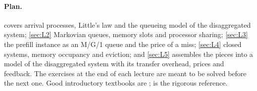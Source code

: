 \paragraph{Plan.}  covers arrival processes, Little's law and the
queueing model of the disaggregated system; \cref{sec:L2} Markovian queues,
memory slots and processor sharing; \cref{sec:L3} the prefill instance as an M/G/1
queue and the price of a miss; \cref{sec:L4} closed systems, memory occupancy and
eviction; and \cref{sec:L5} assembles the pieces into a model of the disaggregated
system with its transfer overhead, prices and feedback. The exercises at the end of
each lecture are meant to be solved before the next one. Good introductory textbooks
are \cite{kleinrock1975,harchol2013}; \cite{asmussen2003} is the rigorous reference.
